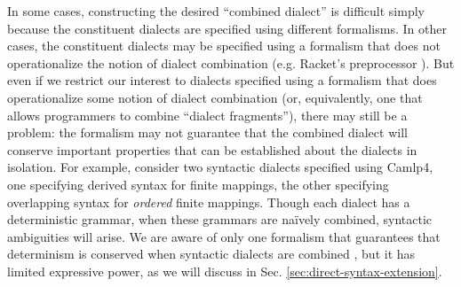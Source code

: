 In some cases, constructing the desired ``combined dialect'' is difficult simply because the constituent dialects are specified using different formalisms. In other cases, the constituent dialects may be specified using a formalism that does not operationalize the notion of dialect combination (e.g. Racket's preprocessor \cite{Flatt:2012:CLR:2063176.2063195}). But even if we restrict our interest to dialects specified using a formalism that does operationalize some notion of dialect combination (or, equivalently, one that allows programmers to combine ``dialect fragments''), there may still be a problem: the formalism may not guarantee that the combined dialect will conserve important properties that can be established about the dialects in isolation. %
For example, consider two syntactic dialects specified using Camlp4, one specifying derived syntax for finite mappings, the other specifying overlapping syntax for \emph{ordered} finite mappings. Though each dialect has a deterministic grammar, when these grammars are na\"ively  combined, syntactic ambiguities will arise. We are aware of only one formalism that guarantees that determinism is conserved when syntactic dialects are combined \cite{conf/pldi/SchwerdfegerW09}, but it has limited expressive power, as we will discuss in Sec. \ref{sec:direct-syntax-extension}.


